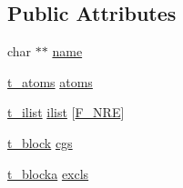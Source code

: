 \subsection*{\-Public \-Attributes}
\begin{DoxyCompactItemize}
\item 
char $\ast$$\ast$ \hyperlink{structgmx__moltype__t_ae95e62eef8f13cc4eda411d09f8b3bf1}{name}
\item 
\hyperlink{structt__atoms}{t\-\_\-atoms} \hyperlink{structgmx__moltype__t_af760b3a13193bf60232fae7b1b97281c}{atoms}
\item 
\hyperlink{structt__ilist}{t\-\_\-ilist} \hyperlink{structgmx__moltype__t_ae02d80885f5466e4190b119871bf6965}{ilist} \mbox{[}\hyperlink{share_2template_2gromacs_2types_2idef_8h_aa52ea6a123f47db5e6b145e5fc5e369aa619bce9d967702fd746289c3f61269f2}{\-F\-\_\-\-N\-R\-E}\mbox{]}
\item 
\hyperlink{structt__block}{t\-\_\-block} \hyperlink{structgmx__moltype__t_ae75f4e5900d9d97ca036b7c3b55bc505}{cgs}
\item 
\hyperlink{structt__blocka}{t\-\_\-blocka} \hyperlink{structgmx__moltype__t_ab8681cd30bf9c5af7bd5267d4b7fbe78}{excls}
\end{DoxyCompactItemize}


